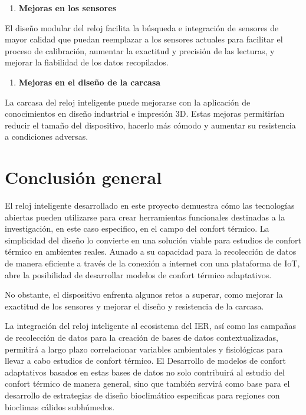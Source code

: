 \documentclass[
  12pt,
  letterpaper,
  DIV=11,
  numbers=noendperiod]{scrreport}
\providecommand{\tightlist}{%
  \setlength{\itemsep}{0pt}\setlength{\parskip}{0pt}}\usepackage{longtable,booktabs,array}
\begin{document}
\begin{enumerate}
\def\labelenumi{\arabic{enumi}.}
\setcounter{enumi}{3}
\tightlist
\item
  \textbf{Mejoras en los sensores}
\end{enumerate}

El diseño modular del reloj facilita la búsqueda e integración de
sensores de mayor calidad que puedan reemplazar a los sensores actuales
para facilitar el proceso de calibración, aumentar la exactitud y
precisión de las lecturas, y mejorar la fiabilidad de los datos
recopilados.

\begin{enumerate}
\def\labelenumi{\arabic{enumi}.}
\setcounter{enumi}{4}
\tightlist
\item
  \textbf{Mejoras en el diseño de la carcasa}
\end{enumerate}

La carcasa del reloj inteligente puede mejorarse con la aplicación de
conocimientos en diseño industrial e impresión 3D. Estas mejoras
permitirían reducir el tamaño del dispositivo, hacerlo más cómodo y
aumentar su resistencia a condiciones adversas.

\hypertarget{conclusiuxf3n-general}{%
\section{Conclusión general}\label{conclusiuxf3n-general}}

El reloj inteligente desarrollado en este proyecto demuestra cómo las
tecnologías abiertas pueden utilizarse para crear herramientas
funcionales destinadas a la investigación, en este caso especifico, en
el campo del confort térmico. La simplicidad del diseño lo convierte en
una solución viable para estudios de confort térmico en ambientes
reales. Aunado a su capacidad para la recolección de datos de manera
eficiente a través de la conexión a internet con una plataforma de IoT,
abre la posibilidad de desarrollar modelos de confort térmico
adaptativos.

No obstante, el dispositivo enfrenta algunos retos a superar, como
mejorar la exactitud de los sensores y mejorar el diseño y resistencia
de la carcasa.

La integración del reloj inteligente al ecosistema del IER, así como las
campañas de recolección de datos para la creación de bases de datos
contextualizadas, permitirá a largo plazo correlacionar variables
ambientales y fisiológicas para llevar a cabo estudios de confort
térmico. El Desarrollo de modelos de confort adaptativos basados en
estas bases de datos no solo contribuirá al estudio del confort térmico
de manera general, sino que también servirá como base para el desarrollo
de estrategias de diseño bioclimático especificas para regiones con
bioclimas cálidos subhúmedos.
\end{document}
